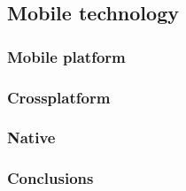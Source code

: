 \subsection{Mobile technology}

\subsubsection{Mobile platform}
\subsubsection{Crossplatform}
\subsubsection{Native}

\subsubsection{Conclusions}